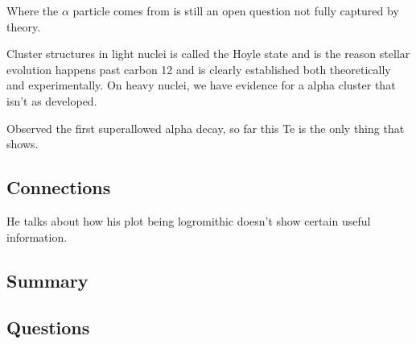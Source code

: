 Where the $\alpha$ particle comes from is still an open question not fully captured by theory.

Cluster structures in light nuclei is called the Hoyle state and is the reason stellar evolution happens past carbon 12 and is clearly established both theoretically and experimentally. On heavy nuclei, we have evidence for a alpha cluster that isn't as developed.

Observed the first superallowed alpha decay, so far this Te is the only thing that shows.
\subsection{Connections}
He talks about how his plot being logromithic doesn't show certain useful information.

\subsection{Summary}


\subsection{Questions}
